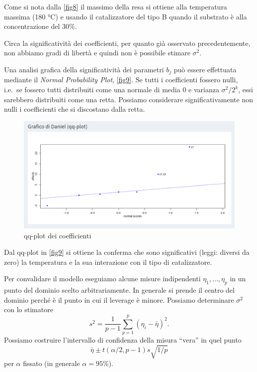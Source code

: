 \documentclass[
]{book}
\begin{document}
Come si nota dalla \autoref{fig8} il massimo della resa si ottiene alla temperatura massima (180 °C) e usando il catalizzatore del tipo B quando il substrato è alla concentrazione del 30\%.

Circa la significatività dei coefficienti, per quanto già osservato precedentemente, non abbiamo gradi di libertà e quindi non è possibile stimare \(\sigma^2\).

Una analisi grafica della significatività dei parametri \(b_j\) può essere effettuata mediante il \emph{Normal Probability Plot}, \autoref{fig9}. Se tutti i coefficienti fossero nulli, i.e.~se fossero tutti distribuiti come una normale di media \(0\) e varianza \(\sigma^2/2^k\), essi sarebbero distribuiti come una retta. Possiamo considerare significativamente non nulli i coefficienti che si discostano dalla retta.

\begin{figure}

{\centering \includegraphics[width=1\linewidth]{Immagini/09_qqplot} 

}

\caption{qq-plot dei coefficienti \label{fig9}}\label{fig:unnamed-chunk-13}
\end{figure}

Dal qq-plot in \autoref{fig9} si ottiene la conferma che sono significativi (leggi: diversi da zero) la temperatura e la sua interazione con il tipo di catalizzatore.

Per convalidare il modello eseguiamo alcune misure indipendenti \(\eta_1,\dots,\eta_p\) in un punto del dominio scelto arbitrariamente. In generale si prende il centro del dominio perché è il punto in cui il leverage è minore.
Possiamo determinare \(\sigma^2\) con lo stimatore
\[
s^2=\frac{1}{p-1}\sum_{p=1}^p(\eta_i-\bar{\eta})^2.
\]
Possiamo costruire l'intervallo di confidenza della misura ``vera'' in quel punto
\[
\bar{\eta}\pm t(\alpha/2,p-1)s\sqrt{1/p}
\]
per \(\alpha\) fissato (in generale \(\alpha=95\%\)).
\end{document}
